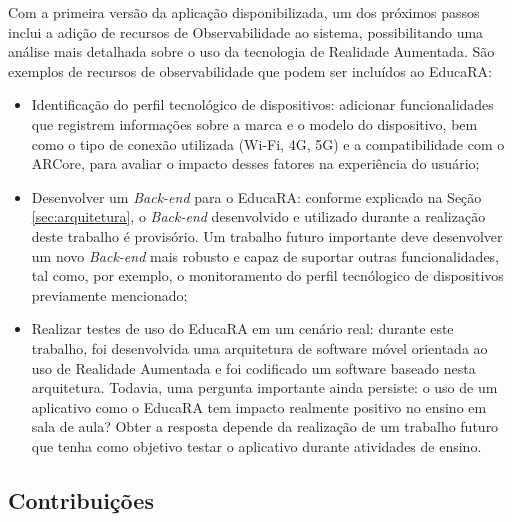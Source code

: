 \documentclass[12pt]{article}
\begin{document}
Com a primeira versão da aplicação disponibilizada, um dos próximos passos inclui a adição de recursos de Observabilidade ao sistema, possibilitando uma análise mais detalhada sobre o uso da tecnologia de Realidade Aumentada. São exemplos de recursos de observabilidade que podem ser incluídos ao EducaRA:

\begin{itemize}
\item Identificação do perfil tecnológico de dispositivos: adicionar funcionalidades que registrem informações sobre a marca e o modelo do dispositivo, bem como o tipo de conexão utilizada (Wi-Fi, 4G, 5G) e a compatibilidade com o ARCore, para avaliar o impacto desses fatores na experiência do usuário;

\item Desenvolver um \textit{Back-end} para o EducaRA: conforme explicado na Seção \ref{sec:arquitetura}, o \textit{Back-end} desenvolvido e utilizado durante a realização deste trabalho é provisório. Um trabalho futuro importante deve desenvolver um novo \textit{Back-end} mais robusto e capaz de suportar outras funcionalidades, tal como, por exemplo, o monitoramento do perfil tecnólogico de dispositivos previamente mencionado;

\item Realizar testes de uso do EducaRA em um cenário real: durante este trabalho, foi desenvolvida uma arquitetura de software móvel orientada ao uso de Realidade Aumentada e foi codificado um software baseado nesta arquitetura. Todavia, uma pergunta importante ainda persiste: o uso de um aplicativo como o EducaRA tem impacto realmente positivo no ensino em sala de aula? Obter a resposta depende da realização de um trabalho futuro que tenha como objetivo testar o aplicativo durante atividades de ensino.
\end{itemize}

\subsection{Contribuições}\label{sec:contribuicoes}


\end{document}
